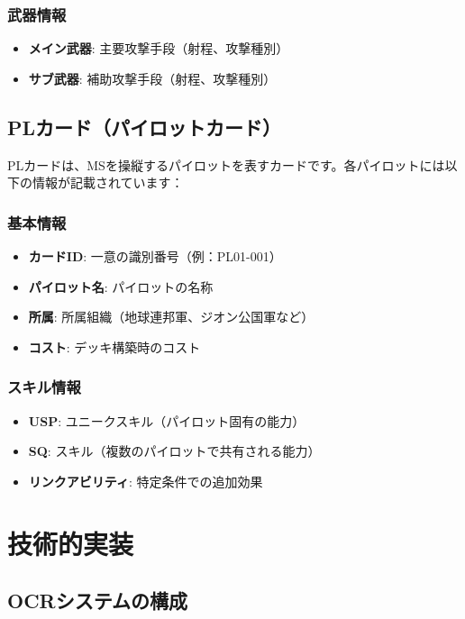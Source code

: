 \documentclass[a4paper,11pt]{jsarticle}
\begin{document}
\subsubsection*{武器情報}
\begin{itemize}
    \item \textbf{メイン武器}: 主要攻撃手段（射程、攻撃種別）
    \item \textbf{サブ武器}: 補助攻撃手段（射程、攻撃種別）
\end{itemize}

\subsection*{PLカード（パイロットカード）}

PLカードは、MSを操縦するパイロットを表すカードです。各パイロットには以下の情報が記載されています：

\subsubsection*{基本情報}
\begin{itemize}
    \item \textbf{カードID}: 一意の識別番号（例：PL01-001）
    \item \textbf{パイロット名}: パイロットの名称
    \item \textbf{所属}: 所属組織（地球連邦軍、ジオン公国軍など）
    \item \textbf{コスト}: デッキ構築時のコスト
\end{itemize}

\subsubsection*{スキル情報}
\begin{itemize}
    \item \textbf{USP}: ユニークスキル（パイロット固有の能力）
    \item \textbf{SQ}: スキル（複数のパイロットで共有される能力）
    \item \textbf{リンクアビリティ}: 特定条件での追加効果
\end{itemize}

\section*{技術的実装}

\subsection*{OCRシステムの構成}
\end{document}
